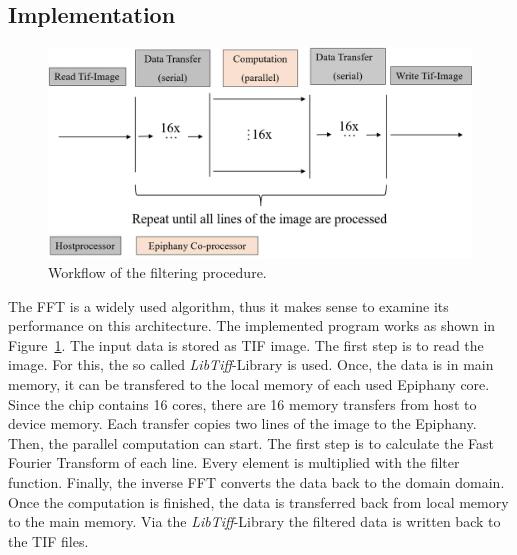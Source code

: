 \documentclass[american, hauptseminar, twoside]{zihpub}
\begin{document}
		\subsection{Implementation}
		\begin{figure}[h]
			\begin{center}
				\includegraphics[width=\textwidth]{grafiken/implementation.png}
				\caption{Workflow of the filtering procedure.}
				\label{fig:implementation}
			\end{center}
		\end{figure}
			The FFT is a widely used algorithm, thus it makes sense to examine its performance on this architecture. The implemented program works as shown in Figure~\ref{fig:implementation}. The input data is stored as TIF image. The first step is to read the image. For this, the so called \textit{LibTiff}-Library \cite{Warmerdam2015} is used. Once, the data is in main memory, it can be transfered to the local memory of each used Epiphany core. Since the chip contains 16 cores, there are 16 memory transfers from host to device memory. Each transfer copies two lines of the image to the Epiphany. Then, the parallel computation can start. The first step is to calculate the Fast Fourier Transform of each line. Every element is multiplied with the filter function. Finally, the inverse FFT converts the data back to the domain domain. Once the computation is finished, the data is transferred back from local memory to the main memory. Via the \textit{LibTiff}-Library \cite{Warmerdam2015} the filtered data is written back to the TIF files.
			
			
\end{document}
